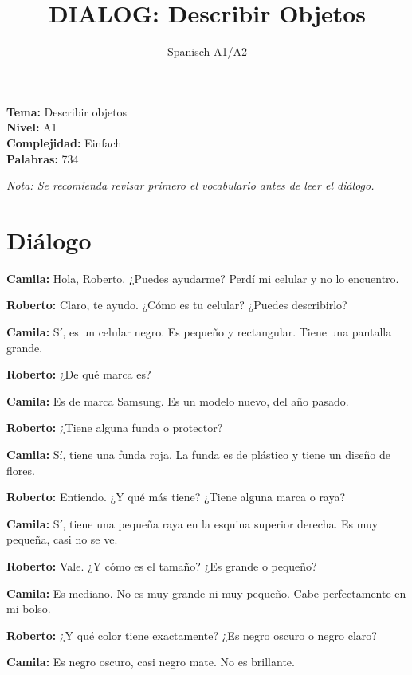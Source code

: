 \documentclass[12pt,a4paper]{article}
\begin{document}
\title{\textbf{DIALOG: Describir Objetos}}
\author{Spanisch A1/A2}
\date{}
\maketitle

\textbf{Tema:} Describir objetos \\
\textbf{Nivel:} A1 \\
\textbf{Complejidad:} Einfach \\
\textbf{Palabras:} 734

\vspace{1em}

\textit{Nota: Se recomienda revisar primero el vocabulario antes de leer el diálogo.}

\vspace{1em}

\section*{Diálogo}

\textbf{Camila:} Hola, Roberto. ¿Puedes ayudarme? Perdí mi celular y no lo encuentro.

\textbf{Roberto:} Claro, te ayudo. ¿Cómo es tu celular? ¿Puedes describirlo?

\textbf{Camila:} Sí, es un celular negro. Es pequeño y rectangular. Tiene una pantalla grande.

\textbf{Roberto:} ¿De qué marca es?

\textbf{Camila:} Es de marca Samsung. Es un modelo nuevo, del año pasado.

\textbf{Roberto:} ¿Tiene alguna funda o protector?

\textbf{Camila:} Sí, tiene una funda roja. La funda es de plástico y tiene un diseño de flores.

\textbf{Roberto:} Entiendo. ¿Y qué más tiene? ¿Tiene alguna marca o raya?

\textbf{Camila:} Sí, tiene una pequeña raya en la esquina superior derecha. Es muy pequeña, casi no se ve.

\textbf{Roberto:} Vale. ¿Y cómo es el tamaño? ¿Es grande o pequeño?

\textbf{Camila:} Es mediano. No es muy grande ni muy pequeño. Cabe perfectamente en mi bolso.

\textbf{Roberto:} ¿Y qué color tiene exactamente? ¿Es negro oscuro o negro claro?

\textbf{Camila:} Es negro oscuro, casi negro mate. No es brillante.
\end{document}
